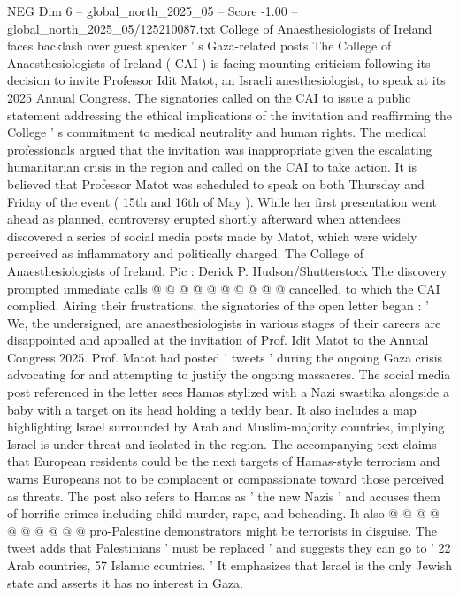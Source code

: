 \begin{textsample}{NEG Dim 6 – global\_north\_2025\_05 – Score -1.00 – global\_north\_2025\_05/125210087.txt}  \label{ex:f6_neg_408}
College of Anaesthesiologists of Ireland faces backlash over guest speaker ' s Gaza-related posts The College of Anaesthesiologists of Ireland ( CAI ) is facing mounting criticism following its decision to invite Professor Idit Matot, an Israeli anesthesiologist, to speak at its 2025 Annual Congress.
The signatories called on the CAI to issue a public statement addressing the ethical implications of the invitation and reaffirming the College ' s commitment to medical neutrality and human rights.
The medical professionals argued that the invitation was inappropriate given the escalating humanitarian crisis in the region and called on the CAI to take action.
It is believed that Professor Matot was scheduled to speak on both Thursday and Friday of the event ( 15th and 16th of May ).
While her first presentation went ahead as planned, controversy erupted shortly afterward when attendees discovered a series of social media posts made by Matot, which were widely perceived as inflammatory and politically charged.
The College of Anaesthesiologists of Ireland.
Pic : Derick P.
Hudson/Shutterstock The discovery prompted immediate calls @ @ @ @ @ @ @ @ @ @ cancelled, to which the CAI complied.
Airing their frustrations, the signatories of the open letter began : ' We, the undersigned, are anaesthesiologists in various stages of their careers are disappointed and appalled at the invitation of Prof.
Idit Matot to the Annual Congress 2025.
Prof.
Matot had posted ' tweets ' during the ongoing Gaza crisis advocating for and attempting to justify the ongoing massacres.
The social media post referenced in the letter sees Hamas stylized with a Nazi swastika alongside a baby with a target on its head holding a teddy bear.
It also includes a map highlighting Israel surrounded by Arab and Muslim-majority countries, implying Israel is under threat and isolated in the region.
The accompanying text claims that European residents could be the next targets of Hamas-style terrorism and warns Europeans not to be complacent or compassionate toward those perceived as threats.
The post also refers to Hamas as ' the new Nazis ' and accuses them of horrific crimes including child murder, rape, and beheading.
It also @ @ @ @ @ @ @ @ @ @ pro-Palestine demonstrators might be terrorists in disguise.
The tweet adds that Palestinians ' must be replaced ' and suggests they can go to ' 22 Arab countries, 57 Islamic countries. ' It emphasizes that Israel is the only Jewish state and asserts it has no interest in Gaza.

\end{textsample}
